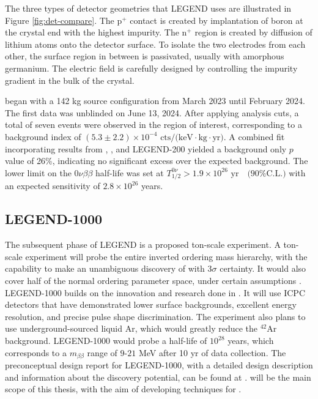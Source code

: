 The three types of detector geometries that LEGEND uses are illustrated in Figure \ref{fig:det-compare}. The p$^+$ contact is created by implantation of boron at the crystal end with the highest impurity. The n$^+$ region is created by diffusion of lithium atoms onto the detector surface. To isolate the two electrodes from each other, the surface region in between is passivated, usually with amorphous germanium. The electric field is carefully designed by controlling the impurity gradient in the bulk of the crystal. 


{\Ltwo} began with a 142 kg source configuration from March 2023 until February 2024. The first data was unblinded on June 13, 2024. After applying analysis cuts, a total of seven events were observed in the region of interest, corresponding to a background index of $ (5.3 \pm 2.2) \times 10^{-4} \text{ cts/(keV$\cdot$kg$\cdot$yr)}$. A combined fit incorporating results from {\Gerda}, {\MJ}, and LEGEND-200 yielded a background only $p$ value of 26\%, indicating no significant excess over the expected background. The lower limit on the 0$\nu\beta\beta$ half-life was set at $T^{0\nu}_{1/2} > 1.9 \times 10^{26} \text{ yr} \quad \text{(90\% C.L.)}$ with an expected sensitivity of $2.8 \times 10^{26}$ years. \cite{Pertoldi2024}

\subsection{LEGEND-1000}
The subsequent phase of LEGEND is a proposed ton-scale experiment. A ton-scale experiment will probe the entire inverted ordering mass hierarchy, with the capability to make an unambiguous discovery of {\onbb} with $3\sigma$ certainty. It would also cover half of the normal ordering parameter space, under certain assumptions \cite{l1000_pcdr}. LEGEND-1000 builds on the innovation and research done in {\Ltwo}. It will use ICPC detectors that have demonstrated lower surface backgrounds, excellent energy resolution, and precise pulse shape discrimination. The experiment also plans to use underground-sourced liquid Ar, which would greatly reduce the $^{42}$Ar background. LEGEND-1000 would probe a half-life of $10^{28}$ years, which corresponds to a $m_{\beta\beta}$ range of $9$-$21$ MeV after 10 yr of data collection. The preconceptual design report for LEGEND-1000, with a detailed design description and information about the discovery potential, can be found at \cite{l1000_pcdr}. {\Ltwo} will be the main scope of this thesis, with the aim of developing techniques for {\Lthou}.


